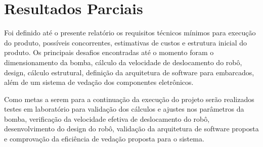 \chapter{Resultados Parciais}
Foi definido até o presente relatório os requisitos técnicos mínimos para execução do produto, possíveis concorrentes, estimativas de custos e estrutura inicial do produto. Os principais desafios encontradas até o momento foram o dimensionamento da bomba, cálculo da velocidade de deslocamento do robô, design, cálculo estrutural, definição da arquitetura de software para embarcados, além de um sistema de vedação dos componentes eletrônicos.

\par Como metas a serem para a continuação da execução do projeto serão realizados testes em laboratório para validação dos cálculos e ajustes nos parâmetros da bomba, verificação da velocidade efetiva de deslocamento do robô, desenvolvimento do design do robô, validação da arquitetura de software proposta e comprovação da eficiência de vedação proposta para o sistema.

\par 